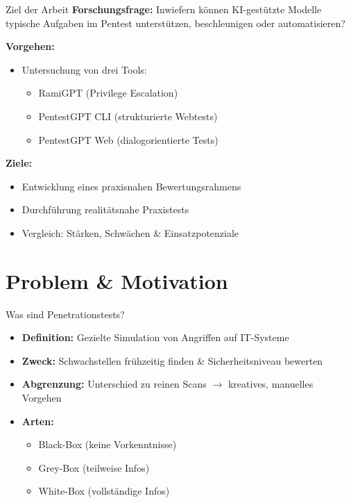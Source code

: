 \documentclass[
	aspectratio=169,	%
	onlytextwidth,		%
	t,					%
	]{beamer}
\begin{document}
\begin{frame}{Ziel der Arbeit}
	\textbf{Forschungsfrage:}  
	Inwiefern können KI-gestützte Modelle typische Aufgaben im Pentest unterstützen, beschleunigen oder automatisieren?
	
	\textbf{Vorgehen:}
	\begin{itemize}
		\item Untersuchung von drei Tools:
		\begin{itemize}
			\item RamiGPT (Privilege Escalation)
			\item PentestGPT CLI (strukturierte Webtests)
			\item PentestGPT Web (dialogorientierte Tests)
		\end{itemize}
	\end{itemize}
	\textbf{Ziele:}
	\begin{itemize}
		\item Entwicklung eines praxisnahen Bewertungsrahmens
		\item Durchführung realitätsnahe Praxistests
		\item Vergleich: Stärken, Schwächen \& Einsatzpotenziale
	\end{itemize}
\end{frame}




\section{Problem \& Motivation}
\begin{frame}{Was sind Penetrationstests?}
	\begin{itemize}
		\item \textbf{Definition:} Gezielte Simulation von Angriffen auf IT-Systeme
		\item \textbf{Zweck:} Schwachstellen frühzeitig finden \& Sicherheitsniveau bewerten
		\item \textbf{Abgrenzung:} Unterschied zu reinen Scans $\rightarrow$ kreatives, manuelles Vorgehen
		\item \textbf{Arten:}
		\begin{itemize}
			\item Black-Box (keine Vorkenntnisse)
			\item Grey-Box (teilweise Infos)
			\item White-Box (vollständige Infos)
		\end{itemize}
	\end{itemize}
\end{frame}
\end{document}
